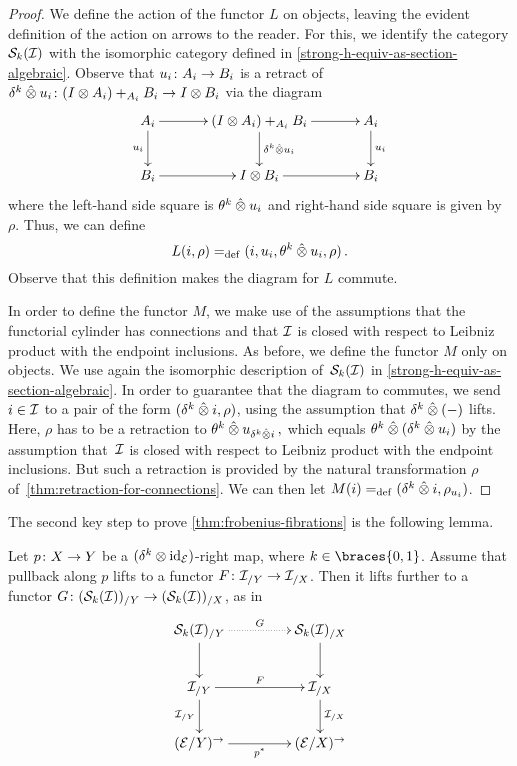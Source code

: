 \documentclass[reqno,10pt,a4paper,oneside,draft]{amsart}
\begin{document}
\begin{proof}
We define the action of the functor $L$ on objects, leaving the evident definition of the action on arrows to the reader.
For this, we identify the category $\cal{S}_k(\cal{I})$ with the isomorphic category defined in \cref{strong-h-equiv-as-section-algebraic}.
Observe that $u_i \co A_i \to B_i$ is a retract of~$\kcyl \hatotimes u_i \co (\interval \otimes A_i) +_{A_i} B_i \to \interval \otimes B_i$ via the diagram
\[
\xymatrix@C+1em{
  A_i \ar[d]_{u_i} \ar[r] & (\interval \otimes A_i) +_{A_i} B_i \ar[r] \ar[d]^{\kcyl \hatotimes u_i } & A_i \ar[d]^{u_i} \\
  B_i \ar[r] & \interval \otimes B_i \ar[r] & B_i }
\]
where the left-hand side square is $\thetak \hatotimes u_i$ and right-hand side square is given by $\rho$.
Thus, we can define
\[
  L(i, \rho) \defeq (i, u_i, \thetak \hatotimes u_i, \rho)
\, .\]
Observe that this definition makes the diagram for $L$ commute.

\medskip

In order to define the functor $M$, we make use of the assumptions that the functorial cylinder has connections and that $\cal{I}$ is closed with respect to Leibniz product with the endpoint inclusions.
As before, we define the functor $M$ only on objects.
We use again the isomorphic description of~$\cal{S}_k(\cal{I})$ in \cref{strong-h-equiv-as-section-algebraic}.
In order to guarantee that the diagram to commutes, we send $i \in \cal{I}$ to a pair of the form $(\kcyl \hatotimes i, \rho)$, using the assumption that $\kcyl \hatotimes (-)$ lifts.
Here, $\rho$ has to be a retraction to $\thetak \hatotimes u_{\kcyl \hatotimes i}\, ,$ which equals $\thetak \hatotimes (\kcyl \hatotimes u_i)$ by the assumption that~$\cal{I}$ is closed with respect to Leibniz product with the endpoint inclusions.
But such a retraction is provided by the natural transformation $\rho$ of~\cref{thm:retraction-for-connections}.
We can then let $M(i) \defeq (\kcyl \hatotimes i, \rho_{u_i})$.
\end{proof}

The second key step to prove \cref{thm:frobenius-fibrations} is the following lemma.

\begin{lemma} \label{strong-h-equiv-base-change-along-fibration}
Let $p \co X \to Y$ be a $(\kcyl \otimes \id_{\calE})$-right map, where $k \in \braces{0, 1}$.
Assume that pullback along $p$ lifts to a functor $F \co \cal{I}_{/Y} \to \cal{I}_{/X}$.
Then it lifts further to a functor $G \co (\cal{S}_k(\cal{I}))_{/Y} \to (\cal{S}_k(\cal{I}))_{/X}$, as in
\[
\xymatrix@C+2em{
  \cal{S}_k(\cal{I})_{/Y}
  \ar@{.>}[r]^{G}
  \ar[d]
&
  \cal{S}_k(\cal{I})_{/X}
  \ar[d]
\\
  \cal{I}_{/Y}
  \ar[r]^{F}
  \ar[d]_{\cal{I}_{/Y}}
&
  \cal{I}_{/X}
  \ar[d]^{\cal{I}_{/X}}
\\
  (\catE / Y)^\to
  \ar[r]_{p^*}
&
  (\catE / X)^\to
}
\]
\end{lemma}
\end{document}
